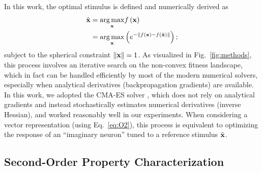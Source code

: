 \documentclass[10pt,twocolumn,letterpaper]{article}
\begin{document}
In this work, the optimal stimulus is defined and numerically derived as 
\begin{align}
\hat{\bf{x}} &= \underset{\bf{x}} {\arg\max} f\left(\bf{x}\right) \label{eq:O1} \\
&= \underset{\bf{x}}{\arg\max} \left( e^{-\left\|f\left(\bf{x}\right)-f\left(\tilde{\bf{x}}\right)\right\|} \right); \label{eq:O2}
\end{align}
subject to the spherical constraint $\left\| \bf{x} \right\| = 1$. 
As visualized in Fig.~\ref{fig:methods}, this process involves an iterative search on the non-convex fitness landscape, which in fact can be handled efficiently by most of the modern numerical solvers, especially when analytical derivatives (\ie backpropagation gradients) are available.
In this work, we adopted the CMA-ES solver \cite{hansen2001completely}, which does not rely on analytical gradients and instead stochastically estimates numerical derivatives (\ie inverse Hessian), and worked reasonably well in our experiments.
When considering a vector representation (using Eq.~\ref{eq:O2}), this process is equivalent to optimizing the response of an ``imaginary neuron'' tuned to a reference stimulus $\tilde{\bf{x}}$.


\subsection{Second-Order Property Characterization}

\newcommand{\expdiff}{The way we constructed the simple linear constraints to enforce the exploration of the landscape is also one of the main differences compared to methods in \cite{erhan2010understanding}.}
\end{document}
